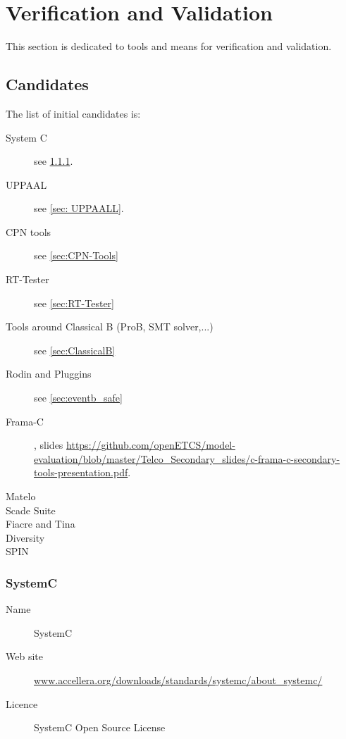 

\chapter{Verification and Validation}
\label{sec:VnV}

This section is dedicated to tools and means for verification and validation.

\section{Candidates}


The list of initial candidates is:

\begin{description}

\item [System C] see \ref{sec:systemC}.
\item [UPPAAL] see \ref{sec: UPPAALL}.
\item [CPN tools] see \ref{sec:CPN-Tools}
\item [RT-Tester] see \ref{sec:RT-Tester}
\item [Tools around Classical B (ProB, SMT solver,...)] see \ref{sec:ClassicalB}
\item [Rodin and Pluggins] see \ref{sec:eventb_safe}
\item [Frama-C], slides \url{https://github.com/openETCS/model-evaluation/blob/master/Telco_Secondary_slides/c-frama-c-secondary-tools-presentation.pdf}.
\item [Matelo]
\item [Scade Suite]
\item [Fiacre and Tina]
\item [Diversity]
\item [SPIN]
\end{description}

\subsection{SystemC}
\label{sec:systemC}

\begin{description}
\item[Name] SystemC
\item[Web site] \url{www.accellera.org/downloads/standards/systemc/about_systemc/}
\item[Licence] SystemC Open Source License
\end{description}

